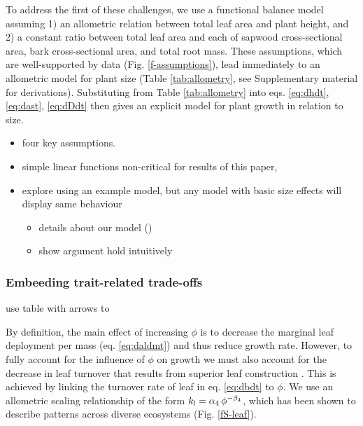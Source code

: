\documentclass[a4paper,11pt]{article}
\begin{document}
To address the first of these challenges, we use a functional balance
model \citep{Yokozawa-1995, Falster-2011} assuming
1) an allometric relation between total leaf area and plant height, and
2) a constant ratio between total leaf area and each of sapwood
cross-sectional area, bark cross-sectional area, and total root mass.
These assumptions, which are well-supported by data (Fig.
\ref{f-assumptions}), lead immediately to an allometric model for plant
size (Table \ref{tab:allometry}, see Supplementary material for
derivations). Substituting from Table \ref{tab:allometry} into eqs.
\ref{eq:dhdt}, \ref{eq:dast}, \ref{eq:dDdt} then gives an explicit model
for plant growth in relation to size.


\begin{itemize}
\itemsep1pt\parskip0pt
\item
  four key assumptions.
\item
  simple linear functions non-critical for results of this paper,
\item
  explore using an example model, but any model with basic size effects
  will display same behaviour

  \begin{itemize}
  \itemsep1pt\parskip0pt
  \item
    details about our model ()
  \item
    show argument hold intuitively
  \end{itemize}
\end{itemize}

\subsubsection{Embeeding trait-related trade-offs}

use table with arrows to



By definition, the main effect of increasing $\phi$ is to decrease the
marginal leaf deployment per mass (eq. \ref{eq:daldmt}) and thus reduce
growth rate. However, to fully account for the influence of $\phi$ on
growth we must also account for the decrease in leaf turnover that
results from superior leaf construction \citep{Wright-2004}.
This is achieved by linking the turnover rate of leaf in eq.
\ref{eq:dbdt} to $\phi$. We use an allometric scaling relationship of
the form $k_{\rm l}=\alpha_4 \, \phi^{-\beta_4}$, which has been
shown to describe patterns across diverse
ecosystems \citep{Wright-2004} (Fig. \ref{fS-leaf}).
\end{document}
